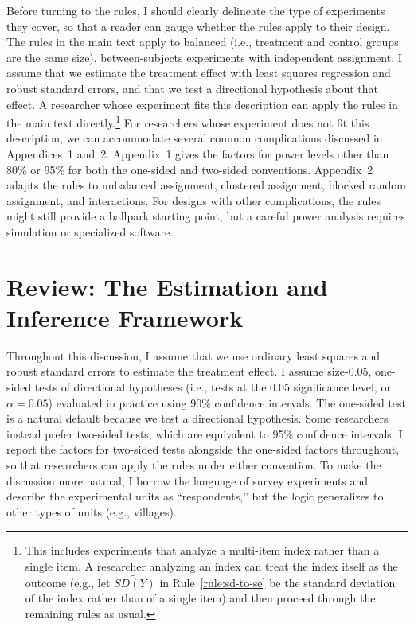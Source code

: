 \documentclass[12pt]{article}
\begin{document}
Before turning to the rules, I should clearly delineate the type of experiments they cover, so that a reader can gauge whether the rules apply to their design.
The rules in the main text apply to balanced (i.e., treatment and control groups are the same size), between-subjects experiments with independent assignment.
I assume that we estimate the treatment effect with least squares regression and robust standard errors, and that we test a directional hypothesis about that effect.
A researcher whose experiment fits this description can apply the rules in the main text directly.\footnote{
  This includes experiments that analyze a multi-item index rather than a single item. A researcher analyzing an index can treat the index itself as the outcome (e.g., let $\widetilde{SD(Y)}$ in Rule~\ref{rule:sd-to-se} be the standard deviation of the index rather than of a single item) and then proceed through the remaining rules as usual.
  }
For researchers whose experiment does not fit this description, we can accommodate several common complications discussed in Appendices~1 and~2.
Appendix~1 gives the factors for power levels other than 80\% or 95\% for both the one-sided and two-sided conventions.
Appendix~2 adapts the rules to unbalanced assignment, clustered assignment, blocked random assignment, and interactions.
For designs with other complications, the rules might still provide a ballpark starting point, but a careful power analysis requires simulation or specialized software.

\section*{Review: The Estimation and Inference Framework}

Throughout this discussion, I assume that we use ordinary least squares and robust standard errors to estimate the treatment effect.
I assume size-0.05, one-sided tests of directional hypotheses (i.e., tests at the 0.05 significance level, or $\alpha = 0.05$) evaluated in practice using 90\% confidence intervals.
The one-sided test is a natural default because we test a directional hypothesis.
Some researchers instead prefer two-sided tests, which are equivalent to 95\% confidence intervals.
I report the factors for two-sided tests alongside the one-sided factors throughout, so that researchers can apply the rules under either convention.
To make the discussion more natural, I borrow the language of survey experiments and describe the experimental units as ``respondents,'' but the logic generalizes to other types of units (e.g., villages).
\end{document}
